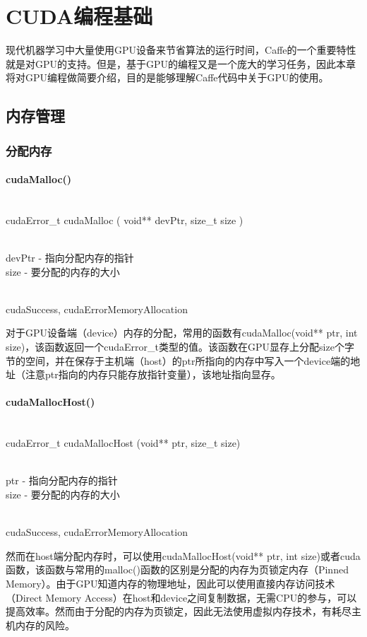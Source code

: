 \chapter{CUDA编程基础}
现代机器学习中大量使用GPU设备来节省算法的运行时间，Caffe的一个重要特性就是对GPU的支持。但是，基于GPU的编程又是一个庞大的学习任务，因此本章将对GPU编程做简要介绍，目的是能够理解Caffe代码中关于GPU的使用。

\section{内存管理}
\subsection{分配内存}\label{cuda/mem/alloc}
\subsubsection{cudaMalloc()}
\begin{cnfrmfunc}
   \item{}\\
      ​cudaError\_t cudaMalloc ( void** devPtr, size\_t size )
   \item{}\\
     devPtr - 指向分配内存的指针\\
     size - 要分配的内存的大小
   \item{}\\
     cudaSuccess, cudaErrorMemoryAllocation
\end{cnfrmfunc}
  对于GPU设备端（device）内存的分配，常用的函数有cudaMalloc(void** ptr, int size)，该函数返回一个cudaError\_t类型的值。该函数在GPU显存上分配size个字节的空间，并在保存于主机端（host）的ptr所指向的内存中写入一个device端的地址（注意ptr指向的内存只能存放指针变量），该地址指向显存。
\subsubsection{cudaMallocHost()}
\begin{cnfrmfunc}
   \item{}\\
     cudaError\_t cudaMallocHost 	(void** ptr, size\_t size) 	
   \item{}\\
     ptr - 指向分配内存的指针\\
     size - 要分配的内存的大小
   \item{}\\
     cudaSuccess, cudaErrorMemoryAllocation
\end{cnfrmfunc}     
然而在host端分配内存时，可以使用cudaMallocHost(void** ptr, int size)或者cuda函数，该函数与常用的malloc()函数的区别是分配的内存为页锁定内存（Pinned Memory）。由于GPU知道内存的物理地址，因此可以使用直接内存访问技术（Direct Memory Access）在host和device之间复制数据，无需CPU的参与，可以提高效率。然而由于分配的内存为页锁定，因此无法使用虚拟内存技术，有耗尽主机内存的风险。
